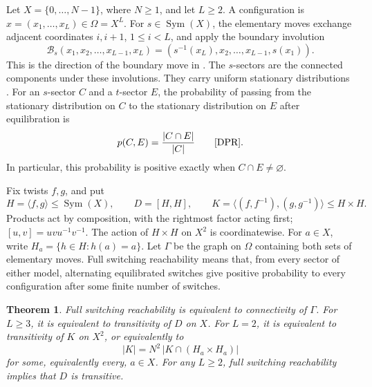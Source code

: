 \documentclass[11pt]{article}
\newtheorem{theorem}{Theorem}
\theoremstyle{remark}
\DeclareMathOperator{\Sym}{Sym}
\newcommand{\twist}{\mathcal{B}}
\begin{document}
Let $X=\{0,\ldots,N-1\}$, where $N\geq1$, and let $L\geq2$.
A configuration is $x=(x_1,\ldots,x_L)\in\Omega=X^L$.
For $s\in\Sym(X)$, the elementary moves exchange adjacent coordinates
$i,i+1$, $1\leq i<L$, and apply the boundary involution
\begin{equation}\label{eq:boundary}
 \twist_s(x_1,x_2,\ldots,x_{L-1},x_L)
 =(s^{-1}(x_L),x_2,\ldots,x_{L-1},s(x_1)).
\end{equation}
This is the direction of the boundary move in
\cite[Section~3.1, (3.1)--(3.3)]{DPR}.
The $s$-sectors are the connected components under these involutions.
They carry uniform stationary distributions
\cite[Proposition~4.4]{DPR}. For an $s$-sector $C$ and a $t$-sector $E$,
the probability of passing from the stationary distribution on $C$ to the
stationary distribution on $E$ after equilibration is
\begin{equation}\label{eq:branch}
 p(C,E)=\frac{|C\cap E|}{|C|}
 \qquad\text{\cite[Proposition~5.2]{DPR}}.
\end{equation}
In particular, this probability is positive exactly when $C\cap E\ne\varnothing$.

Fix twists $f,g$, and put
\[
 H=\langle f,g\rangle\leq\Sym(X),\qquad D=[H,H],\qquad
 K=\langle(f,f^{-1}),(g,g^{-1})\rangle\leq H\times H.
\]
Products act by composition, with the rightmost factor acting first;
$[u,v]=uvu^{-1}v^{-1}$. The action of $H\times H$ on $X^2$ is coordinatewise.
For $a\in X$, write $H_a=\{h\in H:h(a)=a\}$.
Let $\Gamma$ be the graph on $\Omega$ containing both sets of elementary moves.
Full switching reachability means that, from every sector of either model,
alternating equilibrated switches give positive probability to every
configuration after some finite number of switches.

\begin{theorem}\label{thm:main}
Full switching reachability is equivalent to connectivity of $\Gamma$.
For $L\geq3$, it is equivalent to transitivity of $D$ on $X$.
For $L=2$, it is equivalent to transitivity of $K$ on $X^2$, or equivalently to
\begin{equation}\label{eq:two}
 |K|=N^2\,|K\cap(H_a\times H_a)|
\end{equation}
for some, equivalently every, $a\in X$.
For any $L\geq2$, full switching reachability implies that $D$ is transitive.
\end{theorem}
\end{document}
